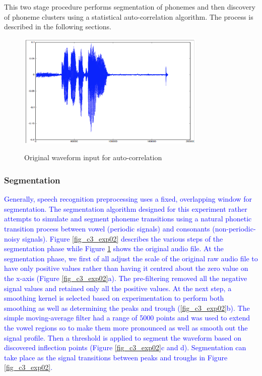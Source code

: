 This two stage procedure performs segmentation of phonemes and then discovery of phoneme clusters using a statistical auto-correlation algorithm.  The process is described in the following sections.
\begin{figure}
\centering
  \includegraphics[width=9cm]{thesis/images/corr}\\
  \caption{Original waveform input for auto-correlation}\label{fig_c3_exp01}
\end{figure}

\subsubsection{Segmentation}
\textcolor{blue}{Generally, speech recognition preprocessing uses a fixed, overlapping window for segmentation. The segmentation algorithm designed for this experiment rather attempts to simulate and segment phoneme transitions using a natural phonetic  transition process between vowel (periodic signals) and consonants (non-periodic-noisy signals). Figure \ref{fig_c3_exp02} describes the various steps of the segmentation phase while Figure \ref{fig_c3_exp01} shows the original audio file. At the segmentation phase, we first of all adjust the scale of the original raw audio file to have only positive values rather than having it centred about the zero value on the x-axis (Figure \ref{fig_c3_exp02}a).  The pre-filtering removed all the negative signal values and retained only all the positive values.  At the next step, a smoothing kernel is selected based on experimentation to perform both smoothing as well as determining the peaks and trough (\ref{fig_c3_exp02}b).   The simple moving-average filter had a range of 5000 points and was used to extend the vowel regions so to make them more pronounced as well as smooth out the signal profile.    Then a threshold is applied to segment the waveform based on discovered inflection points (Figure \ref{fig_c3_exp02}c and d).  Segmentation can take place as the signal transitions between peaks and troughs in Figure \ref{fig_c3_exp02}.}

